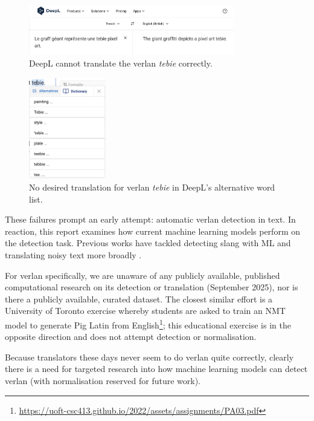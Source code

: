 \documentclass[12pt]{article}
\begin{document}
\begin{figure}[H]
\centering
\includegraphics[width=0.8\textwidth]{figures/deepl_verlan.png}
\caption{\label{fig:deepl_verlan}DeepL cannot translate the verlan \textit{tebie} correctly.}
\end{figure}

\begin{figure}[H]
\centering
\includegraphics[width=0.3\textwidth]{figures/deepl_alt_text.png}
\caption{\label{fig:deepl_alt_text}No desired translation for verlan \textit{tebie} in DeepL's alternative word list.}
\end{figure}

These failures prompt an early attempt: automatic verlan detection in text. In reaction, this report examines how current machine learning models perform on the detection task. Previous works have tackled detecting slang with ML and translating noisy text more broadly \cite{pei2019slang, michel2018mtnt}.

For verlan specifically, we are unaware of any publicly available, published computational research on its detection or translation (September 2025), nor is there a publicly available, curated dataset. The closest similar effort is a University of Toronto exercise whereby students are asked to train an NMT model to generate Pig Latin from English\footnote{\url{https://uoft-csc413.github.io/2022/assets/assignments/PA03.pdf}}; this educational exercise is in the opposite direction and does not attempt detection or normalisation.

Because translators these days never seem to do verlan quite correctly, clearly there is a need for targeted research into how machine learning models can detect verlan (with normalisation reserved for future work).
\end{document}
